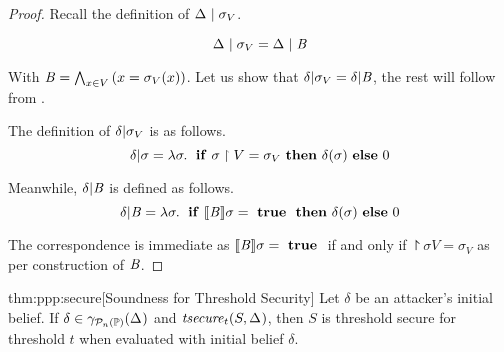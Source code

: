 \begin{proof} Recall the definition of $ \absdcond{\pps{}}{\sigma_V} $.

$$ \absdcond{\pps{}}{\sigma_V} = \absdcond{\pps{}}{\bexp} $$

With $ \bexp = \bigwedge_{x \in V} \paren{x = \sigma_V(x)} $. Let us
show that $ \dcond{\delta}{\sigma_V} = \dcond{\delta}{\bexp} $, the
rest will follow from .

The definition of $ \dcond{\delta}{\sigma_V} $ is as follows.
$$ \dcond{\delta}{\sigma}
= \lambda \sigma \lsep \aif \project{\sigma}{V} = \sigma_V
\athen \delta(\sigma) \aelse 0 $$

Meanwhile, $ \dcond{\delta}{\bexp} $ is defined as follows.
$$ \dcond{\delta}{\bexp}
= \lambda \sigma \lsep \aif \eval{\bexp}{\sigma}
= \atrue \athen \delta(\sigma) \aelse 0 $$

The correspondence is immediate as $ \eval{\bexp}{\sigma} = \atrue $
if and only if $ \project{\sigma}{V} = \sigma_V $ as per construction
of $ \bexp $.
\end{proof}

\begin{reptheorem}{thm:ppp:secure}[Soundness for Threshold Security]
  Let $\delta$ be an attacker's initial belief.  If $\delta \in
  \ppsconc{\pps{}}$ and $\abspolicy{S}{\pps{}}{t}$, then $ S $ is threshold secure
  for threshold $t$ when evaluated with initial belief $\delta$.
\end{reptheorem}

